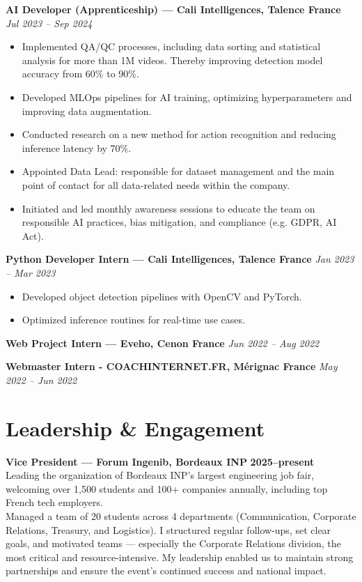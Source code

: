 \documentclass[10pt, letterpaper]{article}
\begin{document}
\textbf{AI Developer (Apprenticeship) — Cali Intelligences, Talence France} \hfill \textit{Jul 2023 – Sep 2024}
\begin{itemize}[topsep=0pt, partopsep=0pt, itemsep=1.5pt, parsep=0pt]
        \item Implemented QA/QC processes, including data sorting and statistical analysis for more than 1M videos. Thereby improving detection model accuracy from 60\% to 90\%.
        \item Developed MLOps pipelines for AI training, optimizing hyperparameters and improving data augmentation.
        \item Conducted research on a new method for action recognition and reducing inference latency by 70\%.
        \item Appointed Data Lead: responsible for dataset management and the main point of contact for all data-related needs within the company.
        \item Initiated and led monthly awareness sessions to educate the team on responsible AI practices, bias mitigation, and compliance (e.g. GDPR, AI Act).
\end{itemize}
\vspace{0.3cm}

\textbf{Python Developer Intern — Cali Intelligences, Talence France} \hfill \textit{Jan 2023 – Mar 2023}
\begin{itemize}[topsep=0pt, partopsep=0pt, itemsep=1.5pt, parsep=0pt]
    \item Developed object detection pipelines with OpenCV and PyTorch.
    \item Optimized inference routines for real-time use cases.
\end{itemize}
\vspace{0.3cm}
\textbf{Web Project Intern — Eveho, Cenon France } \hfill \textit{Jun 2022 – Aug 2022}
\vspace{0.3cm}

\textbf{Webmaster Intern - COACHINTERNET.FR, Mérignac France} \hfill \textit{May 2022 – Jun 2022}
\vspace{0.3cm}
\section*{Leadership \& Engagement}


\textbf{Vice President — Forum Ingenib, Bordeaux INP} \hfill \textbf{2025–present} \\
Leading the organization of Bordeaux INP’s largest engineering job fair, welcoming over 1,500 students and 100+ companies annually, including top French tech employers. \\
Managed a team of 20 students across 4 departments (Communication, Corporate Relations, Treasury, and Logistics). I structured regular follow-ups, set clear goals, and motivated teams — especially the Corporate Relations division, the most critical and resource-intensive. My leadership enabled us to maintain strong partnerships and ensure the event's continued success and national impact.
\end{document}
